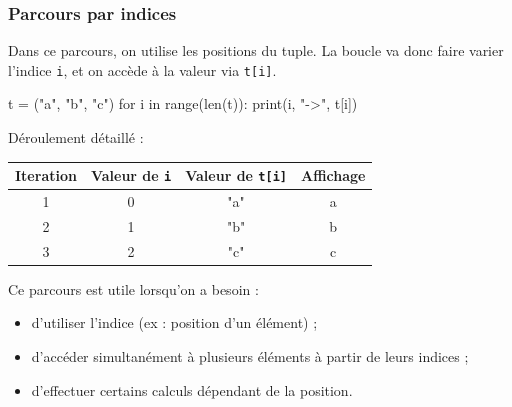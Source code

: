 \documentclass[11pt]{article}
\begin{document}
	\subsubsection*{Parcours par indices}
	
	Dans ce parcours, on utilise les positions du tuple.  
	La boucle va donc faire varier l’indice \texttt{i}, et on accède à la valeur via \texttt{t[i]}.
	
	\begin{python}
		t = ("a", "b", "c")
		for i in range(len(t)):
			print(i, "->", t[i])\end{python}
	
	Déroulement détaillé :
	
	\begin{center}
		\begin{tabular}{|c|c|c|c|}
			\hline
			\textbf{Iteration} & \textbf{Valeur de \texttt{i}} & \textbf{Valeur de \texttt{t[i]}} & \textbf{Affichage}\\
			\hline
			1 & 0 & "a" & a \\
			\hline
			2 & 1 & "b" & b \\
			\hline
			3 & 2 & "c" & c \\
			\hline
		\end{tabular}
	\end{center}
	
	
	Ce parcours est utile lorsqu’on a besoin :
	\begin{itemize}
		\item d’utiliser l’indice (ex : position d’un élément) ;
		\item d’accéder simultanément à plusieurs éléments à partir de leurs indices ;
		\item d’effectuer certains calculs dépendant de la position.
	\end{itemize}
	
	
	
	
\end{document}

